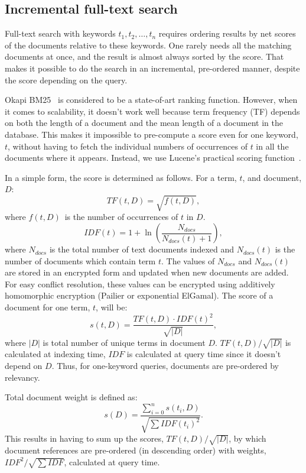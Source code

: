 \documentclass[notitlepage,longbibliography]{revtex4-1}
\begin{document}
\subsection{Incremental full-text search}

Full-text search with keywords $t_1, t_2,\ldots, t_n$ requires ordering results by net scores of the documents relative to these keywords.
One rarely needs all the matching documents at once, and the result is almost always sorted by the score.
That makes it possible to do the search in an incremental, pre-ordered manner, despite the score depending on the query.

Okapi BM25~\cite{wiki:OkapiBM25} is considered to be a state-of-art ranking function.
However, when it comes to scalability, it doesn't work well because term frequency (TF) depends on both the length of a document
and the mean length of a document in the database.
This makes it impossible to pre-compute a score even for one keyword, $t$, without having to fetch the individual numbers of occurrences of $t$
in all the documents where it appears.
Instead, we use Lucene's practical scoring function~\cite{lucene-practical-scoring}.

In a simple form, the score is determined as follows.
For a term, $t$, and document, $D$:
$$TF(t, D) = \sqrt{f(t, D)},$$
where $f(t, D)$~is the number of occurrences of $t$ in $D$.
$$IDF(t) = 1 + \ln\left( \frac{N_{docs}}{N_{docs}(t) + 1} \right),$$
where $N_{docs}$ is the total number of text documents indexed and $N_{docs}(t)$ is the number of documents which contain term $t$.
The values of $N_{docs}$ and $N_{docs}(t)$ are stored in an encrypted form and updated when new documents are added.
For easy conflict resolution, these values can be encrypted using additively homomorphic encryption (Pailier or exponential ElGamal).
The score of a document for one term, $t$, will be:
$$s(t, D) = \frac{TF(t, D) \cdot IDF(t)^2}{\sqrt{|D|}},$$
where $|D|$ is total number of unique terms in document $D$.
$TF(t,D)/\sqrt{|D|}$ is calculated at indexing time, $IDF$ is calculated at query time since it doesn't depend on $D$.
Thus, for one-keyword queries, documents are pre-ordered by relevancy.

Total document weight is defined as:
$$s(D) = \frac{\sum_{i=0}^n s(t_i, D)}{\sqrt{\sum IDF(t_i)^2}}.$$
This results in having to sum up the scores, $TF(t,D)/\sqrt{|D|}$, by which document references are pre-ordered (in descending order)
with weights, $IDF^2/\sqrt{\sum IDF}$, calculated at query time.
\end{document}
